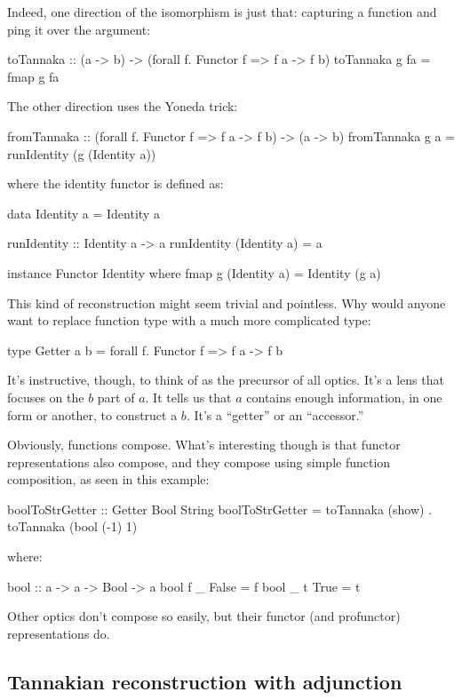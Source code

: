 \documentclass[DaoFP]{subfiles}
\begin{document}
Indeed, one direction of the isomorphism is just that: capturing a function and ping it over the argument:
\begin{haskell}
toTannaka :: (a -> b) -> (forall f. Functor f => f a -> f b)
toTannaka g fa = fmap g fa
\end{haskell}
The other direction uses the Yoneda trick:
\begin{haskell}
fromTannaka :: (forall f. Functor f => f a -> f b) -> (a -> b)
fromTannaka g a = runIdentity (g (Identity a))
\end{haskell}
where the identity functor is defined as:
\begin{haskell}
data Identity a = Identity a 
  
runIdentity :: Identity a -> a
runIdentity (Identity a) = a

instance Functor Identity where
  fmap g (Identity a) = Identity (g a)
\end{haskell}

This kind of reconstruction might seem trivial and pointless. Why would anyone want to replace function type  with a much more complicated type:
\begin{haskell}
type Getter a b = forall f. Functor f => f a -> f b
\end{haskell}
It's instructive, though, to think of  as the precursor of all optics. It's a lens that focuses on the $b$ part of $a$. It tells us that $a$ contains enough information, in one form or another, to construct a $b$. It's a ``getter'' or an ``accessor.'' 

Obviously, functions compose. What's interesting though is that functor representations also compose, and they compose using simple function composition, as seen in this example:
\begin{haskell}
boolToStrGetter :: Getter Bool String
boolToStrGetter = toTannaka (show) . toTannaka (bool (-1) 1)
\end{haskell}
where:
\begin{haskell}
bool :: a -> a -> Bool -> a
bool f _ False = f
bool _ t True  = t
\end{haskell}

Other optics don't compose so easily, but their functor (and profunctor) representations do. 

\subsection{Tannakian reconstruction with adjunction}
\end{document}
